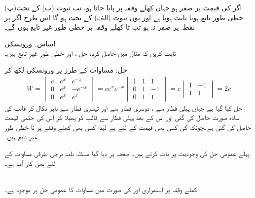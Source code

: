(پ)\quad اگر  کی قیمت  پر صفر ہو جہاں  کھلے وقفہ  پر پایا جاتا ہو، تب ثبوت (ب) کے تحت خطی طور تابع ہونا ثابت ہوتا ہے اور یوں ثبوت (الف) کے تحت  ہو گا۔اس طرح اگر  پر نقطہ  پر  صفر نہ ہو تب  تا  کھلے وقفہ  پر خطی طور غیر تابع ہوں گے۔

 \quad اساس۔ ورونسکی\\
ثابت کریں کہ مثال  میں حاصل کردہ حل ،  اور  خطی طور غیر تابع ہیں۔

حل: مساوات  کے طرز پر  ورونسکی لکھ کر
\begin{align*}
W=
\begin{vmatrix}
c& e^x& e^{-x}\\
0& e^x & -e^{-x}\\
0&e^x&e^x
\end{vmatrix}
=c e^{x} e^{-x}
\begin{vmatrix}
1& 1& 1\\
0& 1 & -1\\
0&1&1
\end{vmatrix}=
c
\begin{vmatrix}
1& -1\\
1&1
\end{vmatrix}
=2c
\end{align*}
حل کیا گیا ہے جہاں پہلی قطار سے ، دوسری قطار سے  اور تیسری قطار سے  باہر نکال کر قالب کی سادہ صورت حاصل کی گئی اور اس کے بعد پہلی قطار سے قالب کو پھیلا کر اس کی حتمی قیمت حاصل کی گئی ہے۔چونکہ  کی کسی بھی قیمت کے لئے   ہے لہٰذا کسی بھی کھلے وقفے پر  تا  خطی طور غیر تابع ہیں۔

پہلے عمومی حل کی وجودیت پر بات کرتے ہیں۔ صفحہ  پر دیا گیا مسئلہ  بلند درجی تفرقی مساوات کے لئے بھی کار آمد ہے۔

\\
کھلے وقفہ  پر استمراری  اور  کی صورت میں مساوات  کا عمومی حل  پر موجود ہے۔

